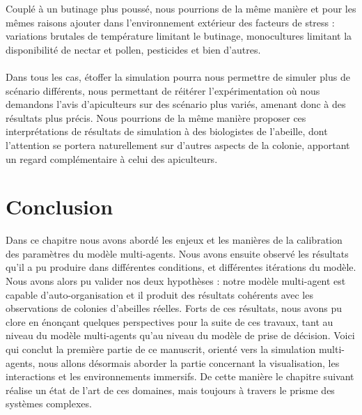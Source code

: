 	Couplé à un butinage plus poussé, nous pourrions de la même manière et pour les mêmes raisons ajouter dans l'environnement extérieur des facteurs de stress : variations brutales de température limitant le butinage, monocultures limitant la disponibilité de nectar et pollen, pesticides et bien d'autres.
	
	\paragraph{}
	Dans tous les cas, étoffer la simulation pourra nous permettre de simuler plus de scénario différents, nous permettant de réitérer l'expérimentation où nous demandons l'avis d'apiculteurs sur des scénario plus variés, amenant donc à des résultats plus précis. Nous pourrions de la même manière proposer ces interprétations de résultats de simulation à des biologistes de l'abeille, dont l'attention se portera naturellement sur d'autres aspects de la colonie, apportant un regard complémentaire à celui des apiculteurs.
	
	
			
	\section*{Conclusion}
	Dans ce chapitre nous avons abordé les enjeux et les manières de la calibration des paramètres du modèle multi-agents. Nous avons ensuite observé les résultats qu'il a pu produire dans différentes conditions, et différentes itérations du modèle. Nous avons alors pu valider nos deux hypothèses : notre modèle multi-agent est capable d'auto-organisation et il produit des résultats cohérents avec les observations de colonies d'abeilles réelles. Forts de ces résultats, nous avons pu clore en énonçant quelques perspectives pour la suite de ces travaux, tant au niveau du modèle multi-agents qu'au niveau du modèle de prise de décision. Voici qui conclut la première partie de ce manuscrit, orienté vers la simulation multi-agents, nous allons désormais aborder la partie concernant la visualisation, les interactions et les environnements immersifs. De cette manière le chapitre suivant réalise un état de l'art de ces domaines, mais toujours à travers le prisme des systèmes complexes.
